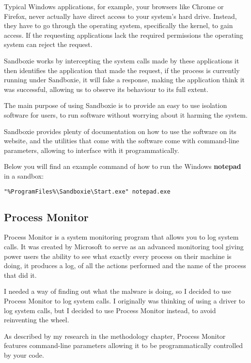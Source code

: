 Typical Windows applications, for example, your browsers like Chrome or Firefox,
never actually have direct access to your system's hard drive.
Instead, they have to go through the operating system, specifically the kernel,
to gain access. If the requesting applications lack the required permissions
the operating system can reject the request.

Sandboxie works by intercepting the system calls made by these applications
it then identifies the application that made the request,
if the process is currently running under Sandboxie,
it will fake a response, making the application think it was successful,
allowing us to observe its behaviour to its full extent.

The main purpose of using Sandboxie is to provide an
easy to use isolation software for users, to run software
without worrying about it harming the system.

Sandboxie provides plenty of documentation on how to use the software on its website,
and the utilities that come with the software come with command-line parameters,
allowing to interface with it programmatically.

Below you will find an example command of how to run the Windows
\textbf{notepad} in a sandbox:

\begin{lstlisting}
"%ProgramFiles%\Sandboxie\Start.exe" notepad.exe
\end{lstlisting}

\subsection{Process Monitor}
Process Monitor is a system monitoring program that allows you to log system calls.
It was created by Microsoft to serve as an advanced monitoring tool giving power users
the ability to see what exactly every process on their machine is doing,
it produces a log, of all the actions performed and the name of the process that did it.

I needed a way of finding out what the malware is doing,
so I decided to use Process Monitor to log system calls.
I originally was thinking of using a driver to log system calls,
but I decided to use Process Monitor instead, to avoid reinventing the wheel.

As described by my research in the methodology chapter,
Process Monitor features command-line parameters
allowing it to be programmatically controlled by your code.

